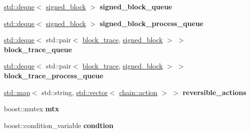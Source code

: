 \begin{DoxyCompactItemize}
\mbox{\hyperlink{classstd_1_1deque}{std\+::deque}}$<$ \mbox{\hyperlink{structaacio_1_1chain_1_1signed__block}{signed\+\_\+block}} $>$ {\bfseries signed\+\_\+block\+\_\+queue}
\item 
\mbox{\label{classaacio_1_1mongo__db__plugin__impl_ae3703996f7d4504894118bda7cf702d0}} 
\mbox{\hyperlink{classstd_1_1deque}{std\+::deque}}$<$ \mbox{\hyperlink{structaacio_1_1chain_1_1signed__block}{signed\+\_\+block}} $>$ {\bfseries signed\+\_\+block\+\_\+process\+\_\+queue}
\item 
\mbox{\label{classaacio_1_1mongo__db__plugin__impl_ac83b31b69463cb1adb821458ac8bf037}} 
\mbox{\hyperlink{classstd_1_1deque}{std\+::deque}}$<$ std\+::pair$<$ \mbox{\hyperlink{structaacio_1_1chain_1_1block__trace}{block\+\_\+trace}}, \mbox{\hyperlink{structaacio_1_1chain_1_1signed__block}{signed\+\_\+block}} $>$ $>$ {\bfseries block\+\_\+trace\+\_\+queue}
\item 
\mbox{\label{classaacio_1_1mongo__db__plugin__impl_a5a5afa9eea4feca3a6dbdeca7e857075}} 
\mbox{\hyperlink{classstd_1_1deque}{std\+::deque}}$<$ std\+::pair$<$ \mbox{\hyperlink{structaacio_1_1chain_1_1block__trace}{block\+\_\+trace}}, \mbox{\hyperlink{structaacio_1_1chain_1_1signed__block}{signed\+\_\+block}} $>$ $>$ {\bfseries block\+\_\+trace\+\_\+process\+\_\+queue}
\item 
\mbox{\label{classaacio_1_1mongo__db__plugin__impl_a3513997238082b9e72824402f083805c}} 
\mbox{\hyperlink{classstd_1_1map}{std\+::map}}$<$ std\+::string, \mbox{\hyperlink{classstd_1_1vector}{std\+::vector}}$<$ \mbox{\hyperlink{structaacio_1_1chain_1_1action}{chain\+::action}} $>$ $>$ {\bfseries reversible\+\_\+actions}
\item 
\mbox{\label{classaacio_1_1mongo__db__plugin__impl_a1d2a0849c94d49679a5d0af4cb87f2c0}} 
boost\+::mutex {\bfseries mtx}
\item 
\mbox{\label{classaacio_1_1mongo__db__plugin__impl_a859f2a40aac19ec0c72c2aa2a27c4492}} 
boost\+::condition\+\_\+variable {\bfseries condtion}
\item 
\mbox{\label{classaacio_1_1mongo__db__plugin__impl_a08ade864eb5b969a550229a0863e13e8}} 

\end{DoxyCompactItemize}

